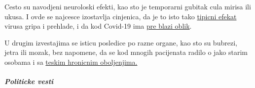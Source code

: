 Cesto su navodjeni neuroloski efekti, kao sto je temporarni gubitak cula
mirisa ili ukusa. I ovde se najcesce izostavlja cinjenica, da je to isto
tako \href{https://www.ncbi.nlm.nih.gov/pubmed/25294743}{tipicni efekat}
virusa gripa i prehlade, i da kod Covid-19 ima
\href{https://www.ncbi.nlm.nih.gov/pubmed/23948436}{pre blazi oblik}.

U drugim izvestajima se isticu posledice po razne organe, kao sto su
bubrezi, jetra ili mozak, bez napomene, da se kod mnogih pacijenata
radilo o jako starim osobama i sa
\href{https://www.epicentro.iss.it/coronavirus/sars-cov-2-decessi-italia}{teskim
hronicnim oboljenjima.}

\hypertarget{politicke-vesti-1}{%
\subparagraph{\texorpdfstring{\textbf{Politicke
vesti}}{Politicke vesti}}\label{politicke-vesti-1}}

